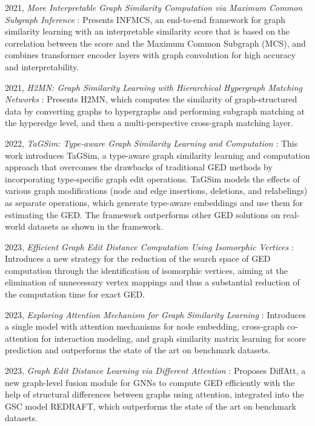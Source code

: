 \documentclass[../Thesis.tex]{subfiles}
\begin{document}
	2021, \textit{More Interpretable Graph Similarity Computation via Maximum Common Subgraph Inference} \cite{more_interpretable_graph_similarity_computation_via_maximum_common_subgraph_inference}: Presents INFMCS, an end-to-end framework for graph similarity learning with an interpretable similarity score that is based on the correlation between the score and the Maximum Common Subgraph (MCS), and combines transformer encoder layers with graph convolution for high accuracy and interpretability.
	
	2021, \textit{H2MN: Graph Similarity Learning with Hierarchical Hypergraph Matching Networks} \cite{h2mn__graph_similarity_learning_with_hierarchical_hypergraph_matching_networks}: Presents H2MN, which computes the similarity of graph-structured data by converting graphs to hypergraphs and performing subgraph matching at the hyperedge level, and then a multi-perspective cross-graph matching layer.
	
	2022, \textit{TaGSim: Type-aware Graph Similarity Learning and Computation} \cite{TaGSim_type_aware_graph_similarity_learning_and_computation}: This work introduces TaGSim, a type-aware graph similarity learning and computation approach that overcomes the drawbacks of traditional GED methods by incorporating type-specific graph edit operations. TaGSim models the effects of various graph modifications (node and edge insertions, deletions, and relabelings) as separate operations, which generate type-aware embeddings and use them for estimating the GED. The framework outperforms other GED solutions on real-world datasets as shown in the framework.
	
	2023, \textit{Efficient Graph Edit Distance Computation Using Isomorphic Vertices} \cite{efficient_graph_edit_distance_computation_using_isomorphic_vertices}: Introduces a new strategy for the reduction of the search space of GED computation through the identification of isomorphic vertices, aiming at the elimination of unnecessary vertex mappings and thus a substantial reduction of the computation time for exact GED.
	
	2023, \textit{Exploring Attention Mechanism for Graph Similarity Learning} \cite{exploring_attention_mechanism_for_graph_similarity_learning}: Introduces a single model with attention mechanisms for node embedding, cross-graph co-attention for interaction modeling, and graph similarity matrix learning for score prediction and outperforms the state of the art on benchmark datasets.
	
	2023, \textit{Graph Edit Distance Learning via Different Attention} \cite{graph_edit_distance_learning_via_different_attention}: Proposes DiffAtt, a new graph-level fusion module for GNNs to compute GED efficiently with the help of structural differences between graphs using attention, integrated into the GSC model REDRAFT, which outperforms the state of the art on benchmark datasets.
	
\end{document}
